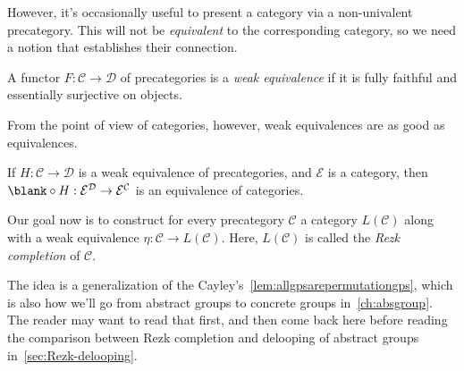 However, it's occasionally useful to present a category
via a non-univalent precategory.
This will not be \emph{equivalent} to the corresponding category,
so we need a notion that establishes their connection.
\begin{definition}\label{def:we-cat}
  A functor $F : \mathcal C \to \mathcal D$ of precategories
  is a \emph{weak equivalence} if it is fully faithful
  and essentially surjective on objects.
\end{definition}
From the point of view of categories, however,
weak equivalences are as good as equivalences.
\begin{lemma}\label{lem:precomp-equiv-cat}
  If $H : \mathcal C \to \mathcal D$ is a weak equivalence of precategories,
  and $\mathcal E$ is a category,
  then $\blank\circ H : \mathcal E^{\mathcal D} \to \mathcal E^{\mathcal C}$
  is an equivalence of categories.
\end{lemma}
Our goal now is to construct for every precategory $\mathcal C$
a category $L(\mathcal C)$ along with a weak equivalence
$\eta : \mathcal C \to L(\mathcal C)$.
Here, $L(\mathcal C)$ is called the \emph{Rezk completion} of $\mathcal C$.

The idea is a generalization of the Cayley's~\cref{lem:allgpsarepermutationgps},
which is also how we'll go from abstract groups to concrete groups
in~\cref{ch:absgroup}.
The reader may want to read that first,
and then come back here before reading the comparison
between Rezk completion and delooping of abstract groups
in~\cref{sec:Rezk-delooping}.

